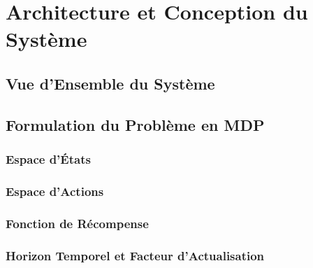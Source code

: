 \chapter{Architecture et Conception du Système}
\label{chap:architecture}


\section{Vue d'Ensemble du Système}
\label{sec:ch3_overview}


\section{Formulation du Problème en MDP}
\label{sec:ch3_mdp_formulation}

\subsection{Espace d'États}
\label{subsec:ch3_state_space}


\subsection{Espace d'Actions}
\label{subsec:ch3_action_space}


\subsection{Fonction de Récompense}
\label{subsec:ch3_reward}


\subsection{Horizon Temporel et Facteur d'Actualisation}
\label{subsec:ch3_horizon}

